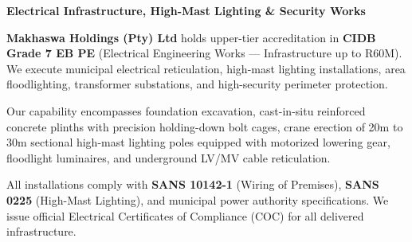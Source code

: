 \documentclass[a4paper,11pt]{article}
\begin{document}
\noindent
\begin{minipage}[t]{0.62\textwidth}
    \vspace{0pt}
    {\large\bfseries\color{mhnavy} Electrical Infrastructure, High-Mast Lighting \& Security Works}
    \vspace{0.12cm}

    {\fontsize{9pt}{13pt}\selectfont\color{mhtext}
    \textbf{Makhaswa Holdings (Pty) Ltd} holds upper-tier accreditation in \textbf{CIDB Grade 7 EB PE} (Electrical Engineering Works --- Infrastructure up to R60M). We execute municipal electrical reticulation, high-mast lighting installations, area floodlighting, transformer substations, and high-security perimeter protection.
    }

    \vspace{0.22cm}

    {\fontsize{9pt}{13pt}\selectfont\color{mhtext}
    Our capability encompasses foundation excavation, cast-in-situ reinforced concrete plinths with precision holding-down bolt cages, crane erection of 20m to 30m sectional high-mast lighting poles equipped with motorized lowering gear, floodlight luminaires, and underground LV/MV cable reticulation.
    }

    \vspace{0.22cm}

    {\fontsize{9pt}{13pt}\selectfont\color{mhtext}
    All installations comply with \textbf{SANS 10142-1} (Wiring of Premises), \textbf{SANS 0225} (High-Mast Lighting), and municipal power authority specifications. We issue official Electrical Certificates of Compliance (COC) for all delivered infrastructure.
    }
\end{minipage}
\hfill
\end{document}
